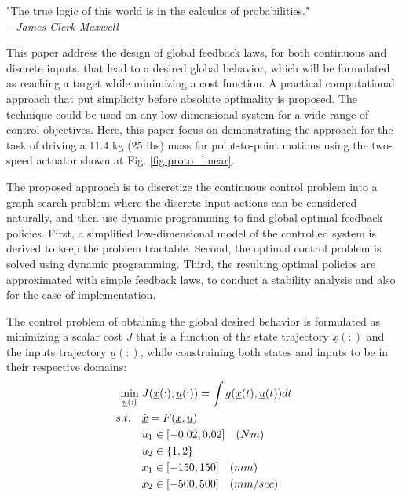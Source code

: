 \begin{flushright}
\small"The true logic of this world is in the calculus of probabilities." \\ \emph{-- James Clerk Maxwell}
\end{flushright}

This paper address the design of global feedback laws, for both continuous and discrete inputs, that lead to a desired global behavior, which will be formulated as reaching a target while minimizing a cost function. A practical computational approach that put simplicity before absolute optimality is proposed. The technique could be used on any low-dimensional system for a wide range of control objectives. Here, this paper focus on demonstrating the approach for the task of driving a 11.4 kg (25 lbs) mass for point-to-point motions using the two-speed actuator shown at Fig. \ref{fig:proto_linear}. 

The proposed approach is to discretize the continuous control problem into a graph search problem where the discrete input actions can be considered naturally, and then use dynamic programming to find global optimal feedback policies. First, a simplified low-dimensional model of the controlled system is derived to keep the problem tractable. Second, the optimal control problem is solved using dynamic programming. Third, the resulting optimal policies are approximated with simple feedback laws, to conduct a stability analysis and also for the ease of implementation.

The control problem of obtaining the global desired behavior is formulated as minimizing a scalar cost $J$ that is a function of the state trajectory $\underline{x}(:)$ and the inputs trajectory $\underline{u}(:)$, while constraining both states and inputs to be in their respective domains:
\begin{align}
	\operatornamewithlimits{min}\limits_{\underline{u}(:)} \; & J(\underline{x}(:),\underline{u}(:)) = \int g(\underline{x}(t),\underline{u}(t)) dt  \\
	s.t. \quad & \underline{\dot{x}} = F(\underline{x}, \underline{u}) \\
	& u_1 \in [ -0.02 , 0.02 ] \quad (Nm) \\
	& u_2 \in \{ 1 , 2 \} \\
	& x_1 \in [ -150 , 150 ] \quad (mm) \\
	& x_2 \in [ -500 , 500 ] \quad (mm/sec)
	\label{eq:min}
\end{align}

